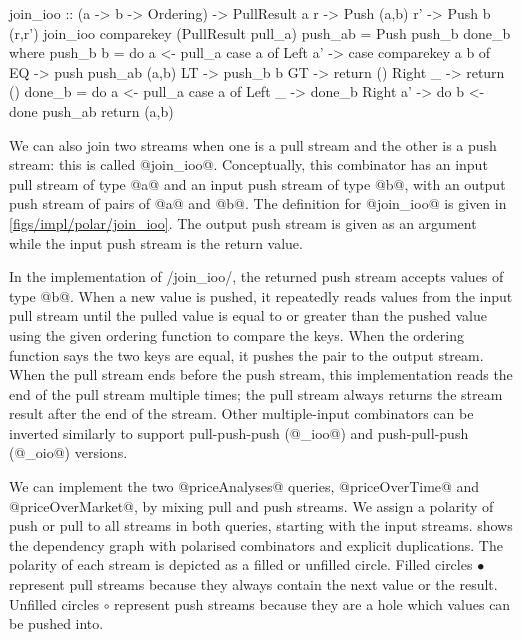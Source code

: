 \begin{haskell}[float,caption=Polarised implementation of \Hs/join_ioo/,label=figs/impl/polar/join_ioo]
join_ioo :: (a -> b -> Ordering) -> PullResult a r
         -> Push (a,b) r'        -> Push b (r,r')
join_ioo comparekey (PullResult pull_a) push_ab = Push push_b done_b
 where
  push_b b = do
    a <- pull_a
    case a of
     Left a' -> case comparekey a b of
      EQ     -> push push_ab (a,b)
      LT     -> push_b b
      GT     -> return ()
     Right _ -> return () 
  done_b = do
    a <- pull_a
    case a of
     Left _   -> done_b
     Right a' -> do
      b <- done push_ab
      return (a,b)
\end{haskell}


We can also join two streams when one is a pull stream and the other is a push stream: this is called @join_ioo@.
Conceptually, this combinator has an input pull stream of type @a@ and an input push stream of type @b@, with an output push stream of pairs of @a@ and @b@.
The definition for @join_ioo@ is given in \cref{figs/impl/polar/join_ioo}.
The output push stream is given as an argument while the input push stream is the return value.

In the implementation of \Hs/join_ioo/, the returned push stream accepts values of type @b@.
When a new value is pushed, it repeatedly reads values from the input pull stream until the pulled value is equal to or greater than the pushed value using the given ordering function to compare the keys.
When the ordering function says the two keys are equal, it pushes the pair to the output stream.
When the pull stream ends before the push stream, this implementation reads the end of the pull stream multiple times; the pull stream always returns the stream result after the end of the stream.
Other multiple-input combinators can be inverted similarly to support pull-push-push (@_ioo@) and push-pull-push (@_oio@) versions.

We can implement the two @priceAnalyses@ queries, @priceOverTime@ and @priceOverMarket@, by mixing pull and push streams.
We assign a polarity of push or pull to all streams in both queries, starting with the input streams.
 shows the dependency graph with polarised combinators and explicit duplications.
The polarity of each stream is depicted as a filled or unfilled circle.
Filled circles $\bullet$ represent pull streams because they always contain the next value or the result.
Unfilled circles $\circ$ represent push streams because they are a hole which values can be pushed into.

